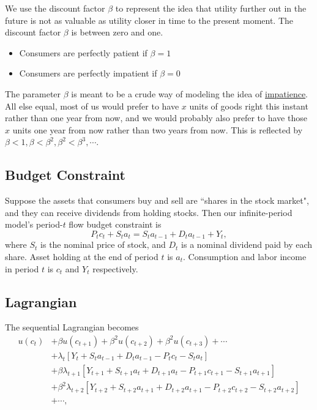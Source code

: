 \documentclass[10pt]{article}
\begin{document}
We use the discount factor $ \beta $ to represent the idea that utility further out in the future
is not as valuable as utility closer in time to the present moment. The discount factor $ \beta $
is between zero and one. 
\begin{itemize}
\item Consumers are perfectly patient if $ \beta = 1 $
\item Consumers are perfectly impatient if $ \beta = 0 $
\end{itemize}

The parameter $ \beta $ is meant to be a crude way of modeling the idea of {\underline {impatience}}.
All else equal, most of us would prefer to have $ x $ units of goods right this instant rather than
one year from now, and we would probably also prefer to have those $ x $ units one year from now
rather than two years from now. This is reflected by 
$ \beta < 1, \beta < \beta^{2}, \beta^{2} < \beta^{3}, \cdots $.


\subsection{Budget Constraint}
Suppose the assets that consumers buy and sell are ``shares in the stock market", and they can receive
dividends from holding stocks. Then our infinite-period model's period-$ t $ flow budget constraint
is 
\begin{equation}
P_{t}c_{t} + S_{t}a_{t} = S_{t}a_{t - 1}  + D_{t}a_{t - 1} + Y_{t},
\end{equation}
where $ S_{t} $ is the nominal price of stock, and $ D_{t} $ is a nominal dividend paid by each share.
Asset holding at the end of period $ t $ is $ a_{t} $.
Consumption and labor income in period $ t $ is $ c_{t} $ and $ Y_{t} $ respectively.


\subsection{Lagrangian}
The sequential Lagrangian becomes
\begin{align*}
u(c_{t}) &+ \beta u(c_{t + 1}) + \beta^{2} u(c_{t + 2}) + \beta^{2} u(c_{t + 3}) + \cdots\\
& + \lambda_{t}[Y_{t} + S_{t}a_{t - 1} + D_{t}a_{t - 1} - P_{t}c_{t} - S_{t}a_{t}]\\
& + \beta\lambda_{t + 1}[Y_{t + 1} + S_{t + 1}a_{t} + D_{t + 1}a_{t} - P_{t + 1}c_{t + 1} - S_{t + 1}a_{t + 1}]\\
& + \beta^{2}\lambda_{t + 2}[Y_{t + 2} + S_{t + 2}a_{t+1} + D_{t + 2}a_{t+1} - P_{t + 2}c_{t + 2} - S_{t + 2}a_{t + 2}]\\
& + \cdots,
\end{align*}
\end{document}
